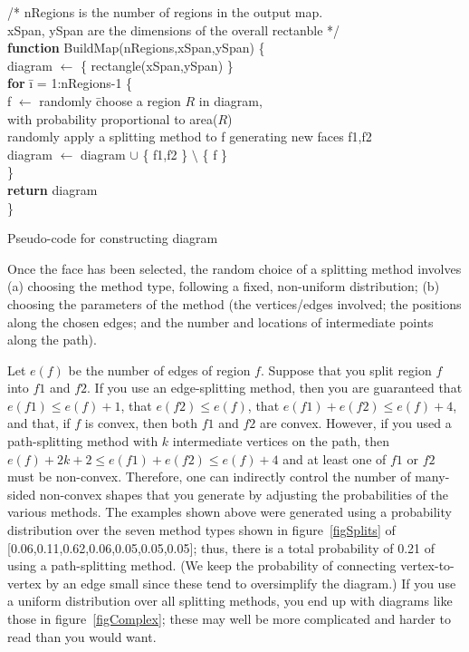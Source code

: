 \documentclass{article}    %
\begin{document}
\begin{table}
\begin{tabbing}
/* nRegions is the number of regions in the output map. \\
xSpan, ySpan are the dimensions of the overall rectanble */ \\
{\bf fun}\={\bf ction} BuildMap(nRegions,xSpan,ySpan) \{ \\
\> diagram $\leftarrow$ \{ rectangle(xSpan,ySpan) \} \\
\> {\bf for} \=i = 1:nRegions-1 \{ \\
\> \> f $\leftarrow$ randomly \=choose a region $R$ in diagram, \\
	\> \> \> with probability proportional to area($R$)  \\
\> \> randomly apply a splitting method to f generating new faces f1,f2 \\
\> \> diagram $\leftarrow$ diagram $\cup$ \{ f1,f2 \} $\setminus$ \{ f \} \\
\> \> \} \\
\> {\bf return} diagram \\
\}  
\end{tabbing}
\caption{Pseudo-code for constructing diagram}
\label{tabBuildMap}
\end{table}

Once the face has been selected, the random choice of a splitting method
involves (a) choosing the method type, following a fixed, non-uniform
distribution; (b) choosing the parameters of the method (the vertices/edges
involved; the positions along the chosen edges; and the number and locations of
intermediate points along the path).

Let $e(f)$ be the number of edges of region $f$. Suppose that you split
region $f$ into $f1$ and $f2$. If you use an edge-splitting method, then
you are guaranteed that $e(f1) \leq e(f)+1$, that $e(f2) \leq e(f)$,
that $e(f1)+e(f2) \leq e(f)+4$, and that, if $f$ is convex, then
both $f1$ and $f2$ are convex. However, if you used a path-splitting
method with $k$ intermediate vertices on the path, then 
$e(f)+2k+2 \leq e(f1)+e(f2) \leq e(f)+4$ and at least one of $f1$ or $f2$
must be non-convex. Therefore, one can indirectly control the number of
many-sided non-convex shapes that you generate by adjusting the probabilities
of the various methods. The examples shown above were generated using
a probability distribution over the seven method types shown in 
figure~\ref{figSplits} of [0.06,0.11,0.62,0.06,0.05,0.05,0.05]; thus,
there is a total probability of 0.21 of using a path-splitting method.
(We keep the probability of connecting vertex-to-vertex by an edge small
since these tend to oversimplify the diagram.) If you use a uniform distribution
over all splitting methods, you end up with diagrams like those in
figure~\ref{figComplex}; these may well be more complicated and harder to read
than you would want.
\end{document}

